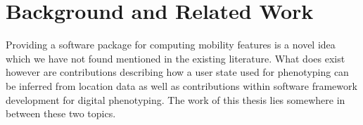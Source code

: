 \chapter{Background and Related Work}
\label{chapter:02}
Providing a software package for computing mobility features is a novel idea which we have not found mentioned in the existing literature. What does exist however are contributions describing how a user state used for phenotyping can be inferred from location data as well as contributions within software framework development for digital phenotyping. The work of this thesis lies somewhere in between these two topics.





